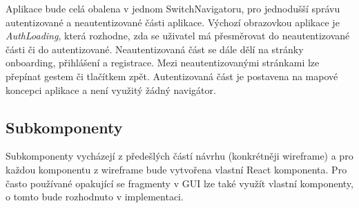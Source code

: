 Aplikace bude celá obalena v jednom SwitchNavigatoru, pro jednodušší správu autentizované a neautentizované části aplikace. Výchozí obrazovkou aplikace je \emph{AuthLoading}, která rozhodne, zda se uživatel má přesměrovat do neautentizované části či do autentizované. Neautentizovaná část se dále dělí na stránky onboarding, přihlášení a registrace. Mezi neautentizovanými stránkami lze přepínat gestem či tlačítkem zpět. Autentizovaná část je postavena na mapové koncepci aplikace a není využitý žádný navigátor.


\subsection{Subkomponenty}

Subkomponenty vycházejí z předešlých částí návrhu (konkrétněji wireframe) a pro každou komponentu z wireframe bude vytvořena vlastní React komponenta. Pro často používané opakující se fragmenty v GUI lze také využít vlastní komponenty, o tomto bude rozhodnuto v implementaci.
